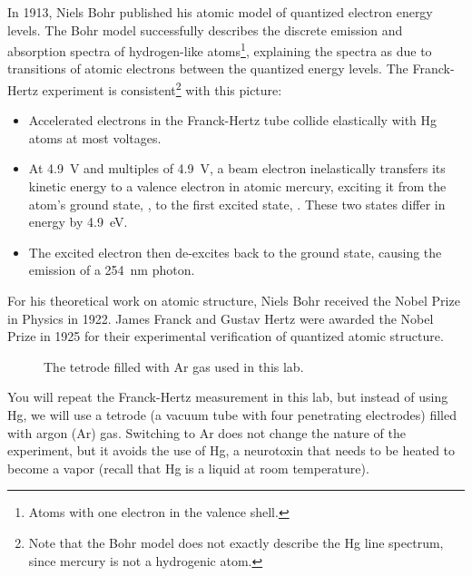 \documentclass[addpoints]{physlabs} %
\begin{document}
\begin{labsection}
\begin{theory}
    In 1913, Niels Bohr published his atomic model of quantized electron energy levels. The Bohr model successfully describes the discrete emission and absorption spectra of hydrogen-like atoms\footnote{Atoms with one electron in the valence shell.}, explaining the spectra as due to transitions of atomic electrons between the quantized energy levels. The Franck-Hertz experiment is consistent\footnote{Note that the Bohr model does not exactly describe the Hg line spectrum, since mercury is not a hydrogenic atom.} with this picture:
    \begin{itemize}
        \item Accelerated electrons in the Franck-Hertz tube collide elastically with Hg atoms at most voltages.
        \item At \qty{4.9}{\volt} and multiples of \qty{4.9}{\volt}, a beam electron inelastically transfers its kinetic energy to a valence electron in atomic mercury, exciting it from the atom's ground state, , to the first excited state, . These two states differ in energy by \qty{4.9}{eV}.
        \item The excited electron then de-excites back to the ground state, causing the emission of a \qty{254}{\nano\meter} photon.
    \end{itemize}
    For his theoretical work on atomic structure, Niels Bohr received the Nobel Prize in Physics in 1922. James Franck and Gustav Hertz were awarded the Nobel Prize in 1925 for their experimental verification of quantized atomic structure.

\end{theory}

\begin{experiment}

    \begin{figure}
        \centering
        \scalebox{0.9}{}
        \caption{The tetrode filled with Ar gas used in this lab.}
        \label{fig: franck-hertz argon tube}
    \end{figure}
    
    You will repeat the Franck-Hertz measurement in this lab, but instead of using Hg, we will use a tetrode (a vacuum tube with four penetrating electrodes) filled with argon (Ar) gas. Switching to Ar does not change the nature of the experiment, but it avoids the use of Hg, a neurotoxin that needs to be heated to become a vapor (recall that Hg is a liquid at room temperature).
    

\end{experiment}
\end{labsection}
\end{document}
